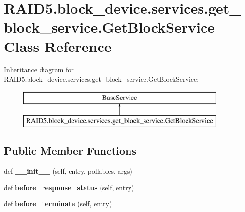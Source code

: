 \hypertarget{class_r_a_i_d5_1_1block__device_1_1services_1_1get__block__service_1_1_get_block_service}{}\section{R\+A\+I\+D5.\+block\+\_\+device.\+services.\+get\+\_\+block\+\_\+service.\+Get\+Block\+Service Class Reference}
\label{class_r_a_i_d5_1_1block__device_1_1services_1_1get__block__service_1_1_get_block_service}
Inheritance diagram for R\+A\+I\+D5.\+block\+\_\+device.\+services.\+get\+\_\+block\+\_\+service.\+Get\+Block\+Service\+:\begin{figure}[H]
\begin{center}
\leavevmode
\includegraphics[height=2.000000cm]{class_r_a_i_d5_1_1block__device_1_1services_1_1get__block__service_1_1_get_block_service}
\end{center}
\end{figure}
\subsection*{Public Member Functions}
\begin{DoxyCompactItemize}
\item 
\mbox{\label{class_r_a_i_d5_1_1block__device_1_1services_1_1get__block__service_1_1_get_block_service_a6fe680bf73350c7bdb9f97266b6fa6ca}} 
def {\bfseries \+\_\+\+\_\+init\+\_\+\+\_\+} (self, entry, pollables, args)
\item 
\mbox{\label{class_r_a_i_d5_1_1block__device_1_1services_1_1get__block__service_1_1_get_block_service_a15bbebfff6a6da5eb532ecb8a94cefa6}} 
def {\bfseries before\+\_\+response\+\_\+status} (self, entry)
\item 
\mbox{\label{class_r_a_i_d5_1_1block__device_1_1services_1_1get__block__service_1_1_get_block_service_a287839bc5348ebbf7e959b10f27c1930}} 
def {\bfseries before\+\_\+terminate} (self, entry)
\end{DoxyCompactItemize}
